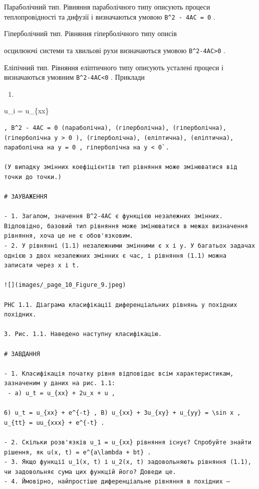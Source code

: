 \documentclass[
  ukrainian,
]{article}
\providecommand{\tightlist}{%
  \setlength{\itemsep}{0pt}\setlength{\parskip}{0pt}}
\begin{document}
Параболічний тип. Рівняння параболічного типу описують процеси
теплопровідності та дифузії і визначаються умовою
\texttt{B\^{}2\ -\ 4AC\ =\ 0} .

Гіперболічний тип. Рівняння гіперболічного типу описів

осцилюючі системи та хвильові рухи визначаються умовою
\texttt{B\^{}2-4AC\textgreater{}0} .

Еліпічний тип. Рівняння еліптичного типу описують усталені процеси і
визначаються умовним \texttt{B\^{}2-4AC\textless{}0} . Приклади

\begin{enumerate}
\def\labelenumi{\alph{enumi})}
\tightlist
\item
\end{enumerate}

u\_i = u\_\{xx\}

\begin{verbatim}
, B^2 - 4AC = 0 (параболічна), (гіперболічна), (гіперболічна), (гіперболічна y > 0 ), (гіперболічна), (еліптична), (еліптична), параболічна на y = 0 , гіперболічна на y < 0`.

(У випадку змінних коефіцієнтів тип рівняння може змінюватися від точки до точки.)

# ЗАУВАЖЕННЯ

- 1. Загалом, значення B^2-4AC є функцією незалежних змінних. Відповідно, базовий тип рівняння може змінюватися в межах визначення рівняння, хоча це не є обов'язковим.
- 2. У рівнянні (1.1) незалежними змінними є x і y. У багатьох задачах однією з двох незалежних змінних є час, і рівняння (1.1) можна записати через x і t.

![](images/_page_10_Figure_9.jpeg)

PHC 1.1. Діаграма класифікації диференціальних рівнянь у похідних похідних.

3. Рис. 1.1. Наведено наступну класифікацію.

# ЗАВДАННЯ

- 1. Класифікація початку рівня відповідає всім характеристикам, зазначеним у даних на рис. 1.1:
 - a) u_t = u_{xx} + 2u_x + u ,

6) u_t = u_{xx} + e^{-t} , B) u_{xx} + 3u_{xy} + u_{yy} = \sin x , u_{tt} = uu_{xxx} + e^{-t} .

- 2. Скільки розв'язків u_1 = u_{xx} рівняння існує? Спробуйте знайти рішення, як u(x, t) = e^{a\lambda + bt} .
- 3. Якщо функції u_1(x, t) і u_2(x, t) задовольняють рівняння (1.1), чи задовольняє сума цих функцій його? Доведи це.
- 4. Ймовірно, найпростіше диференціальне рівняння в похідних —
\end{verbatim}
\end{document}
